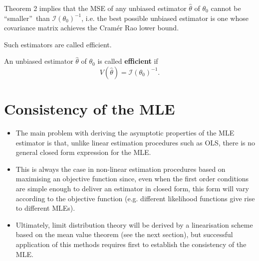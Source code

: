 \documentclass[notes=show]{beamer}
\begin{document}
\begin{frame}%


Theorem 2 implies that the MSE of any unbiased estimator $\hat{\theta}$ of $%
\theta _{0}$ cannot be \textquotedblleft smaller\textquotedblright\ than $%
\mathcal{I}\left( \theta _{0}\right) ^{-1}$, i.e. the best possible unbiased
estimator is one whose covariance matrix achieves the Cram\'{e}r Rao lower
bound.

Such estimators are called efficient.

\begin{definition}
An unbiased estimator $\hat{\theta}$ of $\theta _{0}$ is called \textbf{%
efficient} if 
\begin{equation*}
V\left( \hat{\theta}\right) =\mathcal{I}\left( \theta _{0}\right) ^{-1}.
\end{equation*}
\end{definition}

\end{frame}%

\section{Consistency of the MLE}

\begin{frame}%


\begin{itemize}
\item The main problem with deriving the asymptotic properties of the MLE
estimator is that, unlike linear estimation procedures such as OLS, there is
no general closed form expression for the MLE.

\item This is always the case in non-linear estimation procedures based on
maximising an objective function since, even when the first order conditions
are simple enough to deliver an estimator in closed form, this form will
vary according to the objective function (e.g. different likelihood
functions give rise to different MLEs).

\item Ultimately, limit distribution theory will be derived by a
linearisation scheme based on the mean value theorem (see the next section),
but successful application of this methods requires first to establish the
consistency of the MLE.
\end{itemize}

\end{frame}%
\end{document}
